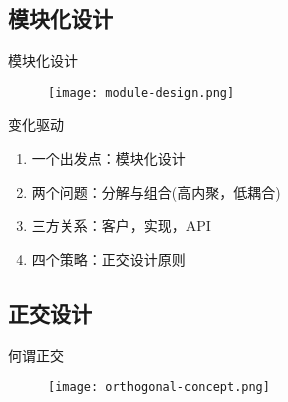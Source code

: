 \subsection{模块化设计}

\begin{frame}{模块化设计}
  \begin{figure}
    \centering
    \texttt{[image: module-design.png]}
  \end{figure}
\end{frame}

\begin{frame}{变化驱动}
\begin{enumerate}
  \item \alert{一个出发点}：模块化设计
  \item \alert{两个问题}：分解与组合(高内聚，低耦合)
  \item \alert{三方关系}：客户，实现，API
  \item \alert{四个策略}：正交设计原则  
\end{enumerate}
\end{frame}

  

\subsection{正交设计}

\begin{frame}{何谓正交}
  \begin{figure}
    \centering
    \texttt{[image: orthogonal-concept.png]}
  \end{figure}
\end{frame}

